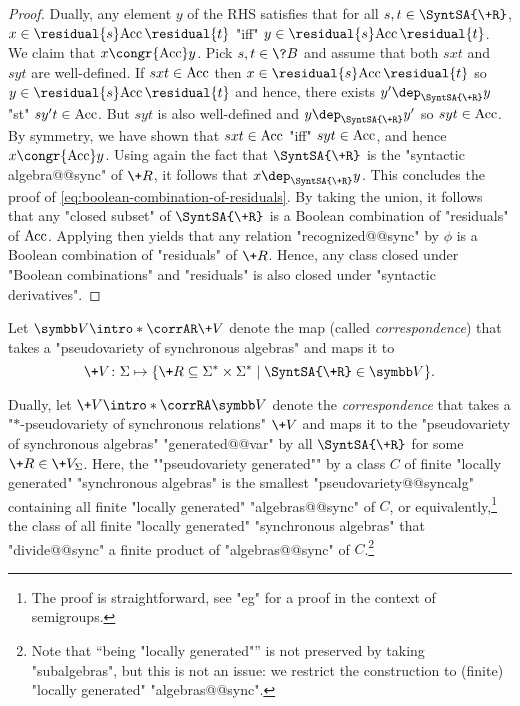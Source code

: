 \begin{proof}
	Dually, any element $y$ of the RHS satisfies that for all $s, t \in \SyntSA{\+R}$,
	$x \in \residual{s} \Acc\,\residual{t}$ "iff" $y \in \residual{s} \Acc\,\residual{t}$.
	We claim that $x \congr{\Acc} y$. Pick $s, t \in \?B$ and assume that
	both $sxt$ and $syt$ are well-defined. If $sxt \in \textrm{Acc}$ then $x \in \residual{s} \Acc\,\residual{t}$ so $y \in \residual{s} \Acc\,\residual{t}$ and hence, there
	exists $y' \dep_{\SyntSA{\+R}} y$ "st" $sy't \in \textrm{Acc}$. But $syt$ is also well-defined
	and $y \dep_{\SyntSA{\+R}} y'$ so $syt \in \textrm{Acc}$. By symmetry, we have shown that
	$sxt \in \textrm{Acc}$ "iff" $syt \in \textrm{Acc}$, and hence $x \congr{\Acc} y$.
	Using again the fact that $\SyntSA{\+R}$ is the "syntactic algebra@@sync" of $\+R$, it 
	follows that $x \dep_{\SyntSA{\+R}} y$. This concludes the proof of
	\eqref{eq:boolean-combination-of-residuals}. By taking the union, it
	follows that any "closed subset" of $\SyntSA{\+R}$ is a Boolean combination
	of "residuals" of $\textrm{Acc}$. Applying 
	then yields that any relation "recognized@@sync" by $\phi$ is a Boolean combination of 
	"residuals" of $\+R$. Hence, any class closed under "Boolean combinations" and
	"residuals" is also closed under "syntactic derivatives".
\end{proof}

Let \AP$\B{V} \intro*\corrAR \+V$ denote the map (called \emph{correspondence}) that takes a 
"pseudovariety of synchronous algebras" and maps it to
\[\+V\colon \Sigma \mapsto \{\+R \subseteq \Sigma^*\times \Sigma^* \mid \SyntSA{\+R} \in \B{V}\}.\]

Dually, let \AP$\+V \intro*\corrRA \B{V}$ denote the \emph{correspondence} that takes
a "$\ast$-pseudo\-variety of synchronous relations" $\+V$
and maps it to the "pseudovariety of synchronous algebras" "generated@@var" by
all $\SyntSA{\+R}$ for some $\+R \in \+V_{\Sigma}$.
Here, the ""pseudovariety generated"" by a class $C$
of finite "locally generated" "synchronous algebras"
is the smallest "pseudovariety@@syncalg" containing
all finite "locally generated" "algebras@@sync" of $C$,
or equivalently,\footnote{The proof is straightforward,
see "eg" \cite[Proposition XI.1.1, p.~190]{Pin2022MathematicalFoundations} for a proof in the context of semigroups.} the class of all finite "locally generated" "synchronous algebras" 
that "divide@@sync" a finite product of "algebras@@sync" of $C$.\footnote{Note that ``being "locally generated"'' is not preserved by taking "subalgebras", but this is not an issue: we restrict the construction to (finite) "locally generated" "algebras@@sync".}

